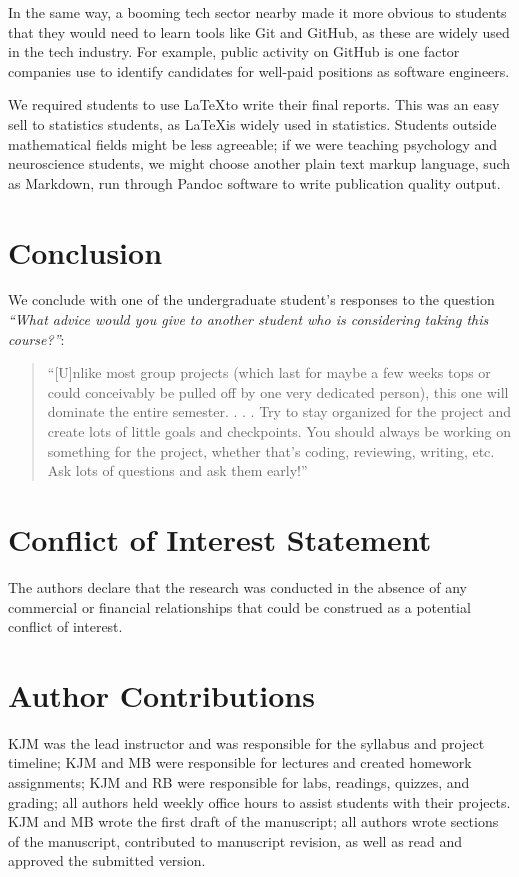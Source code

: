 In the same way, a booming tech sector nearby made it more obvious to students
that they would need to learn tools like Git and GitHub, as these are widely
used in the tech industry.  For example, public activity on GitHub is one
factor companies use to identify candidates for well-paid positions as
software engineers.

We required students to use \LaTeX to write their final reports.  This was an
easy sell to statistics students, as \LaTeX is widely used in statistics.
Students outside mathematical fields might be less agreeable; if we were
teaching psychology and neuroscience students, we might choose
another plain text markup language, such as Markdown, run through Pandoc
software to write publication quality output.

\section{Conclusion}\label{conclusion}

We conclude with one of the undergraduate student's responses to the question
\emph{``What advice would you give to another student who is considering taking this course?''}:
\begin{quotation}
``[U]nlike most group projects (which last for maybe a few weeks tops or
could conceivably be pulled off by one very dedicated person), this one will
dominate the entire semester. . . . Try to stay organized for the project and
create lots of little goals and checkpoints. You should always be working on
something for the project, whether that's coding, reviewing, writing, etc. Ask
lots of questions and ask them early!''
\end{quotation}

\section*{Conflict of Interest Statement}

The authors declare that the research was conducted in the absence of any
commercial or financial relationships that could be construed as a potential
conflict of interest.

\section*{Author Contributions}

KJM was the lead instructor and was responsible for the syllabus and project timeline;
KJM and MB were responsible for lectures and created homework assignments;
KJM and RB were responsible for labs, readings, quizzes, and grading;
all authors held weekly office hours to assist students with their projects.
KJM and MB wrote the first draft of the manuscript;
all authors wrote sections of the manuscript, contributed to manuscript revision, 
as well as read and approved the submitted version.
